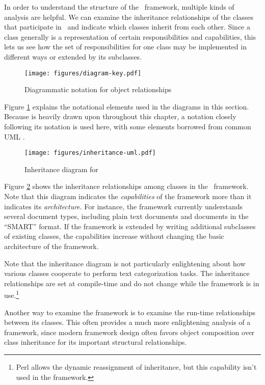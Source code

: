 In order to understand the structure of the \aicat\ framework,
multiple kinds of analysis are helpful.  We can examine the
inheritance relationships of the classes that participate in
\aicat\, and indicate which classes inherit from each other.
Since a class generally is a representation of certain
responsibilities and capabilities, this lets us see how the set of
responsibilities for one class may be implemented in different ways or
extended by its subclasses.

\begin{figure}
\begin{center}
\texttt{[image: figures/diagram-key.pdf]}
\caption{Diagrammatic notation for object relationships}
\label{diagram-key}
\end{center}
\end{figure}

Figure \ref{diagram-key} explains the notational elements used in the
diagrams in this section.  Because \cite{gamma:95} is heavily drawn
upon throughout this chapter, a notation closely following its
notation is used here, with some elements borrowed from common UML
\cite{XXX-uml}.

\begin{figure}
\texttt{[image: figures/inheritance-uml.pdf]}
\caption{Inheritance diagram for \aicat}
\label{inheritance-uml}
\end{figure}

Figure \ref{inheritance-uml} shows the inheritance relationships among
classes in the \aicat\ framework.  Note that this diagram
indicates the \emph{capabilities} of the framework more than it
indicates its \emph{architecture}.  For instance, the framework
currently understands several document types, including plain text
documents and documents in the ``SMART'' format.  If the framework is
extended by writing additional subclasses of existing classes, the
capabilities increase without changing the basic architecture of the
framework.

Note that the inheritance diagram is not particularly enlightening
about how various classes cooperate to perform text categorization
tasks.  The inheritance relationships are set at compile-time and do
not change while the framework is in use.\footnote{Perl allows the
dynamic reassignment of inheritance, but this capability isn't used
in the framework.}

Another way to examine the framework is to examine the run-time
relationships between its classes.  This often provides a much more
enlightening analysis of a framework, since modern framework design
often favors object composition over class inheritance for its
important structural relationships. \cite[p. 20]{gamma:95}

